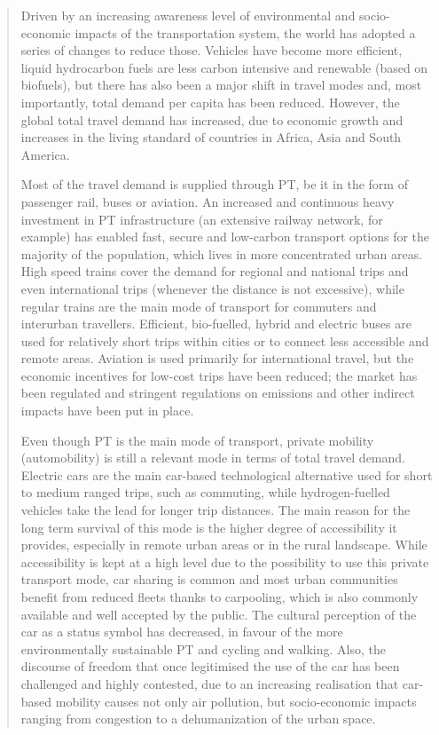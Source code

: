\blockquote{Driven by an increasing awareness level of environmental and socio-economic impacts of the transportation system, the world has adopted a series of changes to reduce those. Vehicles have become more efficient, liquid hydrocarbon fuels are less carbon intensive and renewable (based on biofuels), but there has also been a major shift in travel modes and, most importantly, total demand per capita has been reduced. However, the global total travel demand has increased, due to economic growth and increases in the living standard of countries in Africa, Asia and South America.

Most of the travel demand is supplied through \gls{PT}, be it in the form of passenger rail, buses or aviation. An increased and continuous heavy investment in \gls{PT} infrastructure (an extensive railway network, for example) has enabled fast, secure and low-carbon transport options for the majority of the population, which lives in more concentrated urban areas. High speed trains cover the demand for regional and national trips and even international trips (whenever the distance is not excessive), while regular trains are the main mode of transport for commuters and interurban travellers. Efficient, bio-fuelled, hybrid and electric buses are used for relatively short trips within cities or to connect less accessible and remote areas. Aviation is used primarily for international travel, but the economic incentives for low-cost trips have been reduced; the market has been regulated and stringent regulations on emissions and other indirect impacts have been put in place.

Even though \gls{PT} is the main mode of transport, private mobility (automobility) is still a relevant mode in terms of total travel demand. Electric cars are the main car-based technological alternative used for short to medium ranged trips, such as commuting, while hydrogen-fuelled vehicles take the lead for longer trip distances. The main reason for the long term survival of this mode is the higher degree of accessibility it provides, especially in remote urban areas or in the rural landscape. While accessibility is kept at a high level due to the possibility to use this private transport mode, car sharing is common and most urban communities benefit from reduced fleets thanks to carpooling, which is also commonly available and well accepted by the public. The cultural perception of the car as a status symbol has decreased, in favour of the more environmentally sustainable \gls{PT} and cycling and walking. Also, the discourse of freedom that once legitimised the use of the car has been challenged and highly contested, due to an increasing realisation that car-based mobility causes not only air pollution, but socio-economic impacts ranging from congestion to a dehumanization of the urban space.

}
